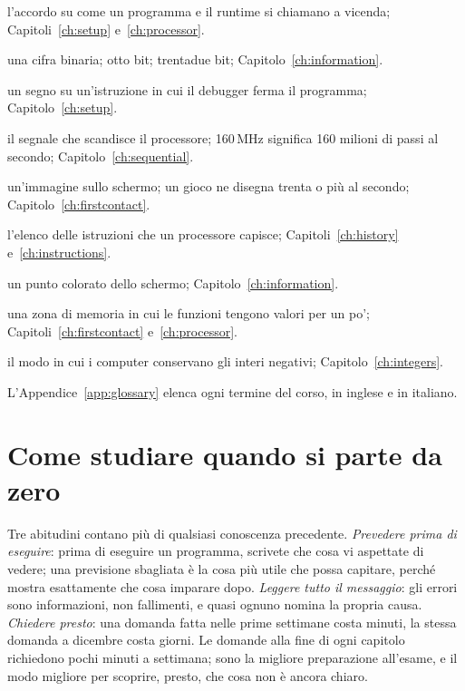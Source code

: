 \begin{description}\small
\item[ABI] l'accordo su come un programma e il runtime si chiamano a vicenda; Capitoli~\ref{ch:setup} e~\ref{ch:processor}.
\item[Bit, byte, parola] una cifra binaria; otto bit; trentadue bit; Capitolo~\ref{ch:information}.
\item[Breakpoint] un segno su un'istruzione in cui il debugger ferma il programma; Capitolo~\ref{ch:setup}.
\item[Clock] il segnale che scandisce il processore; 160\,MHz significa 160 milioni di passi al secondo; Capitolo~\ref{ch:sequential}.
\item[Frame] un'immagine sullo schermo; un gioco ne disegna trenta o più al secondo; Capitolo~\ref{ch:firstcontact}.
\item[Insieme di istruzioni (ISA)] l'elenco delle istruzioni che un processore capisce; Capitoli~\ref{ch:history} e~\ref{ch:instructions}.
\item[Pixel] un punto colorato dello schermo; Capitolo~\ref{ch:information}.
\item[Stack] una zona di memoria in cui le funzioni tengono valori per un po'; Capitoli~\ref{ch:firstcontact} e~\ref{ch:processor}.
\item[Complemento a due] il modo in cui i computer conservano gli interi negativi; Capitolo~\ref{ch:integers}.
\end{description}

\noindent L'Appendice~\ref{app:glossary} elenca ogni termine del corso, in
inglese e in italiano.

\section*{Come studiare quando si parte da zero}

Tre abitudini contano più di qualsiasi conoscenza precedente. \emph{Prevedere
prima di eseguire}: prima di eseguire un programma, scrivete che cosa vi
aspettate di vedere; una previsione sbagliata è la cosa più utile che possa
capitare, perché mostra esattamente che cosa imparare dopo. \emph{Leggere tutto
il messaggio}: gli errori sono informazioni, non fallimenti, e quasi ognuno
nomina la propria causa. \emph{Chiedere presto}: una domanda fatta nelle prime
settimane costa minuti, la stessa domanda a dicembre costa giorni. Le domande
alla fine di ogni capitolo richiedono pochi minuti a settimana; sono la
migliore preparazione all'esame, e il modo migliore per scoprire, presto, che
cosa non è ancora chiaro.
